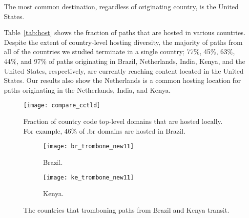 

\begin{finding}
The most common destination, regardless of originating country, is the United States.
\end{finding}
\noindent
Table~\ref{tab:host} shows the fraction of paths that are hosted in various
countries.  Despite the extent of country-level hosting diversity, the
majority of paths from all of the countries we studied terminate in a single
country; 77\%, 45\%, 63\%, 44\%, and 97\% of paths originating in Brazil, Netherlands, India,
Kenya, and the United States, respectively, are currently reaching content located in the
United States.   Our results also
show the Netherlands is a common hosting location for paths originating in the
Netherlands, India, and Kenya.

\begin{figure}[t]
\centering
\texttt{[image: compare\_cctld]}
\caption{Fraction of country code top-level domains that are hosted locally. For example, 46\% of .br domains are hosted in Brazil.}
\label{fig:cctld_graph}
\end{figure}

\begin{figure}[t!]
\centering
\begin{minipage}{\linewidth}
\begin{subfigure}[b]{.45\linewidth}
\texttt{[image: br\_trombone\_new11]}
\caption{Brazil.\label{fig:trombone_brazil}}
\end{subfigure}
\begin{subfigure}[b]{.45\linewidth}
\texttt{[image: ke\_trombone\_new11]}
\caption{Kenya.\label{fig:trombone_kenya}}
\end{subfigure}
\end{minipage}
\caption{The countries that tromboning paths from Brazil and Kenya transit.}
\label{fig:trombone}
\end{figure}



